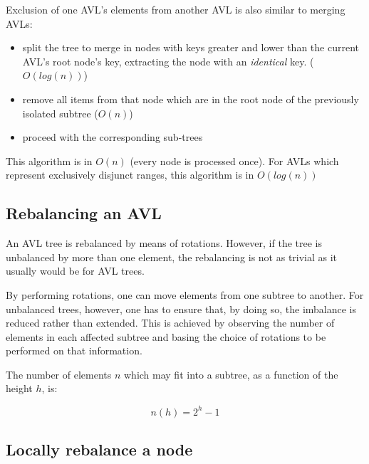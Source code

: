         Exclusion of one AVL's elements from another AVL is also similar to
        merging AVLs:

        \begin{itemize}
            \item split the tree to merge in nodes with keys greater and lower
                than the current AVL's root node's key, extracting the node
                with an \emph{identical} key. ($O(log(n))$)
            \item remove all items from that node which are in the root node
                of the previously isolated subtree ($O(n)$)
            \item proceed with the corresponding sub-trees
        \end{itemize}

        This algorithm is in $O(n)$ (every node is processed once).
        For AVLs which represent exclusively disjunct ranges, this algorithm
        is in $O(log(n))$


    \subsection{Rebalancing an AVL}
    \label{sec:AVL_ops-rebalance}

        An AVL tree is rebalanced by means of rotations.
        However, if the tree is unbalanced by more than one element, the
        rebalancing is not as trivial as it usually would be for AVL trees.

        By performing rotations, one can move elements from one subtree to
        another.
        For unbalanced trees, however, one has to ensure that, by doing so, the
        imbalance is reduced rather than extended.
        This is achieved by observing the number of elements in each affected
        subtree and basing the choice of rotations to be performed on that
        information.

        The number of elements $n$ which may fit into a subtree, as a function
        of the height $h$, is:

        \begin{equation}
            n(h) = 2^h-1
            \label{eq:AVL_ops-max_nodes_in_subtree}
        \end{equation}

    \subsection{Locally rebalance a node}
    \label{sec:AVL_ops-locally-rebalance}

